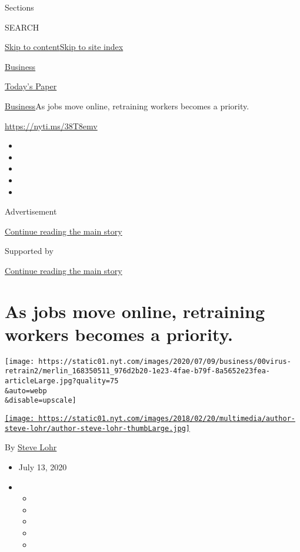 Sections

SEARCH

\protect\hyperlink{site-content}{Skip to
content}\protect\hyperlink{site-index}{Skip to site index}

\href{https://www.nytimes.com/section/business}{Business}

\href{https://myaccount.nytimes.com/auth/login?response_type=cookie\&client_id=vi}{}

\href{https://www.nytimes.com/section/todayspaper}{Today's Paper}

\href{/section/business}{Business}\textbar{}As jobs move online,
retraining workers becomes a priority.

\url{https://nyti.ms/38T8emv}

\begin{itemize}
\item
\item
\item
\item
\item
\end{itemize}

Advertisement

\protect\hyperlink{after-top}{Continue reading the main story}

Supported by

\protect\hyperlink{after-sponsor}{Continue reading the main story}

\hypertarget{as-jobs-move-online-retraining-workers-becomes-a-priority}{%
\section{As jobs move online, retraining workers becomes a
priority.}\label{as-jobs-move-online-retraining-workers-becomes-a-priority}}

\texttt{[image: https://static01.nyt.com/images/2020/07/09/business/00virus-retrain2/merlin\_168350511\_976d2b20-1e23-4fae-b79f-8a5652e23fea-articleLarge.jpg?quality=75\\\&auto=webp\\\&disable=upscale]}

\href{https://www.nytimes.com/by/steve-lohr}{\texttt{[image: https://static01.nyt.com/images/2018/02/20/multimedia/author-steve-lohr/author-steve-lohr-thumbLarge.jpg]}}

By \href{https://www.nytimes.com/by/steve-lohr}{Steve Lohr}

\begin{itemize}
\item
  July 13, 2020
\item
  \begin{itemize}
  \item
  \item
  \item
  \item
  \item
  \end{itemize}
\end{itemize}

